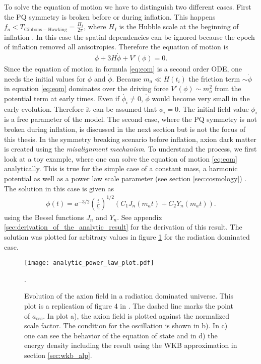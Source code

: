 \documentclass[twoside,a4paper, 12pt]{article}
\numberwithin{equation}{section}
\begin{document}
To solve the equation of motion we have to distinguish two different cases.
First the PQ symmetry is broken before or during inflation.
This happens $f_a < T_\mathrm{Gibbons-Hawking} = \frac{H_I}{2 \pi}$, where
$H_I$ is the Hubble scale at the beginning of inflation \cite[Sec. 3.2]{MarshAxionCosmo}.
In this case the spatial dependencies can be ignored because the epoch of inflation
removed all anisotropies. Therefore the equation of motion is
\begin{align}
    \label{eq:eom}
    \ddot{\phi} + 3 H \dot{\phi} + V'(\phi) = 0.
\end{align}
Since the equation of motion in formula \eqref{eq:eom} is a second order ODE, one needs the initial values
for $\phi$ and $\dot{\phi}$.
Because $m_a \ll H(t_i)$ the friction term $\sim \dot{\phi}$ in equation \eqref{eq:eom} dominates over the
driving force $V'(\phi) \sim m_a^2$ from the potential term at early times.
Even if $\dot{\phi_i} \neq 0$, 
$\dot{\phi}$ would become very small in the early evolution.
Therefore it can be assumed that $\dot{\phi_i} = 0$.
The initial field value $\phi_i$ is a free parameter of the model.
The second case, where the PQ symmetry is not broken during inflation,
is discussed in the next section but is not the focus of this thesis.
In the symmetry breaking scenario before inflation, axion dark matter is created using the \emph{misalignment mechanism}. 
To understand the process, we first look at a toy example, where one can solve
the equation of motion \eqref{eq:eom} analytically.
This is true for the simple case of a constant mass, a harmonic potential as well as a power law scale parameter (see section \ref{sec:cosmology}) \cite[Chap. 4.2, Page 25]{MarshAxionCosmo}.
The solution in this case is given as 
\begin{align}
    \label{eq:power_law_solution}
    \phi(t) = a^{-3/2} \left(\frac{t}{t_i}\right)^{1/2}\left(C_1 J_n(m_a t) + C_2 Y_n(m_a t)\right).
\end{align}
using the Bessel functions $J_n$ and $Y_n$.
See appendix \ref{sec:derivation_of_the_analytic_result} for the derivation of this result.
The solution was plotted for arbitrary values in figure \ref{fig:rad_dom_ax_field} for the radiation dominated case.
\begin{figure}[H]
    \centering
    \texttt{[image: analytic\_power\_law\_plot.pdf]}
    \caption{Evolution of the axion field in a radiation dominated universe. This plot is a replication of figure 4 in \cite{MarshAxionCosmo}. The dashed line marks the point of $a_\mathrm{osc}$.
    In plot a), the axion field is plotted against the normalized scale factor. The condition for the oscillation is shown in b).
    In c) one can see the behavior of the equation of state and in d) the energy density including the result using the
    WKB approximation in section \ref{sec:wkb_alp}. }
    \label{fig:rad_dom_ax_field}.
\end{figure}
\end{document}
